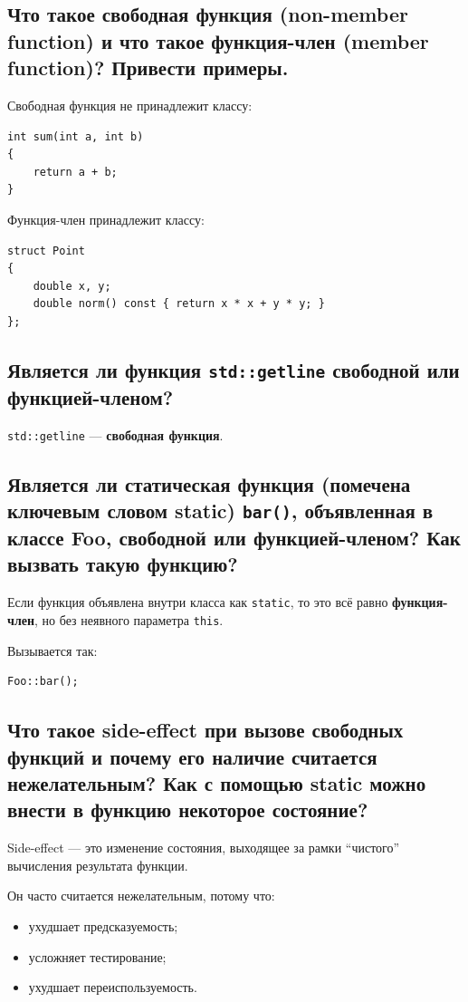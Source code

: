 \subsection{Что такое свободная функция (non-member function) и что такое функция-член (member function)? Привести примеры.}

Свободная функция не принадлежит классу:
\begin{verbatim}
int sum(int a, int b)
{
    return a + b;
}
\end{verbatim}

Функция-член принадлежит классу:
\begin{verbatim}
struct Point
{
    double x, y;
    double norm() const { return x * x + y * y; }
};
\end{verbatim}


\subsection{Является ли функция \texttt{std::getline} свободной или функцией-членом?}

\texttt{std::getline} --- \textbf{свободная функция}.


\subsection{Является ли статическая функция (помечена ключевым словом static) \texttt{bar()}, объявленная в классе Foo, свободной или функцией-членом? Как вызвать такую функцию?}

Если функция объявлена внутри класса как \texttt{static}, то это всё равно \textbf{функция-член}, но без неявного параметра \texttt{this}.

Вызывается так:
\begin{verbatim}
Foo::bar();
\end{verbatim}


\subsection{Что такое side-effect при вызове свободных функций и почему его наличие считается нежелательным? Как с помощью static можно внести в функцию некоторое состояние?}

Side-effect --- это изменение состояния, выходящее за рамки ``чистого'' вычисления результата функции.

Он часто считается нежелательным, потому что:
\begin{itemize}
    \item ухудшает предсказуемость;
    \item усложняет тестирование;
    \item ухудшает переиспользуемость.
\end{itemize}

